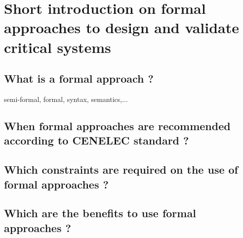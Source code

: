 

\section{Short introduction on formal approaches to  design and validate critical systems}

\subsection{What is a formal approach ?}
semi-formal, formal, syntax, semantics,...

\subsection{When formal approaches are recommended according to CENELEC standard ?}

\subsection{Which constraints are required on the use of formal  approaches ?}





\begin{comment}
No requirement on the way of doing this. \emph{E.g.} to have a certified 
(certifiable?) code generator, two generators and comparison of the result, one
 generation and one verification chain\dots
 \end{comment}
 
\subsection{Which are the benefits to use formal approaches ? }


\begin{comment}
From D.2.5 :

The purpose of the formalization is:
\begin{itemize}
\item to enhance the understanding of modelled subset;
\item to allow formal analysis of the modelled subset;
\item to be able to animate the model for testing an analyzing purpose;
\item to provide information on the completeness and soundness of the SUBSET-26;
\item to be used as a reference formal specification for the implementation of an OBU 
(by the OpenETCS project team and by industrial actors);
\item \dots
\end{itemize}
\end{comment}

